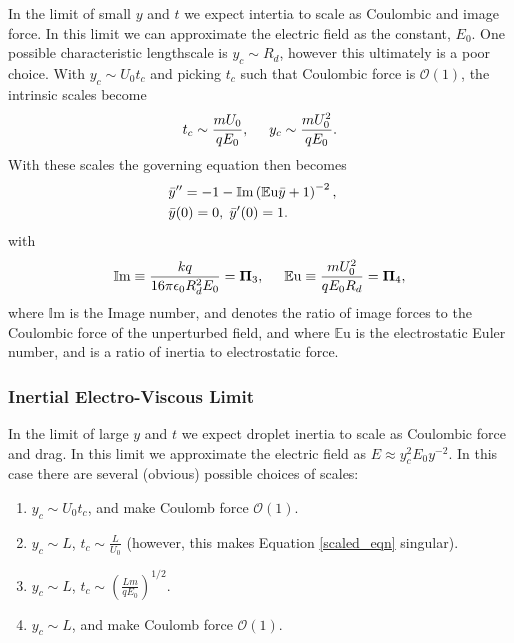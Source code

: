\documentclass[a4paper, 12pt]{article}
\begin{document}
In the limit of small $y$ and $t$ we expect intertia to scale as Coulombic and image force. In this limit we can approximate the electric field as the constant, $E_0$. One possible characteristic lengthscale is $y_c \sim R_d$, however this ultimately is a poor choice. With $y_c \sim U_0 t_c$ and picking $t_c$ such that Coulombic force is $\mathcal{O}(1)$, the intrinsic scales become
\[ t_c \sim \frac{m U_0}{q E_0}, \hspace{5 mm}
y_c \sim \frac{m U_0^2}{q E_0} .
\]
With these scales the governing equation then becomes
\begin{eqnarray}
& \bar{y}'' = -1 - \mathbb{I}\mbox{m} \left( \mathbb{E}\mbox{u}\bar{y} + 1 \right)^{-2} ,& \nonumber \\
& \bar{y}(0) = 0, \hspace{1 mm} \bar{y}'(0) = 1 .& \label{img_limit}
\end{eqnarray} 
with 
\[ \mathbb{I}\mbox{m} \equiv \frac{k q}{16 \pi \epsilon_0 R_d^2 E_0} = \mathbf{\Pi}_3, \hspace{5 mm}
\mathbb{E}\mbox{u} \equiv \frac{m U_0^2}{q E_0 R_d} = \mathbf{\Pi}_4 ,
\]
where $\mathbb{I}\mbox{m}$ is the Image number, and denotes the ratio of image forces to the Coulombic force of the unperturbed field, and where $\mathbb{E}\mbox{u}$ is the electrostatic Euler number, and is a ratio of inertia to electrostatic force.

\subsubsection{Inertial Electro-Viscous Limit}

In the limit of large $y$ and $t$ we expect droplet inertia to scale as Coulombic force and drag. In this limit we approximate the electric field as $E \approx y_c^2 E_0 y^{-2}$. In this case there are several (obvious) possible choices of scales:
\begin{enumerate}
\item $y_c \sim U_0 t_c$, and make Coulomb force $\mathcal{O}(1)$.
\item $y_c \sim L$, $t_c \sim \frac{L}{U_0}$ (however, this makes Equation \ref{scaled_eqn} singular).
\item $y_c \sim L$, $t_c \sim \left( \frac{L m}{q E_0} \right)^{1/2}$.
\item $y_c \sim L$, and make Coulomb force $\mathcal{O}(1)$.
\end{enumerate}
\end{document}
